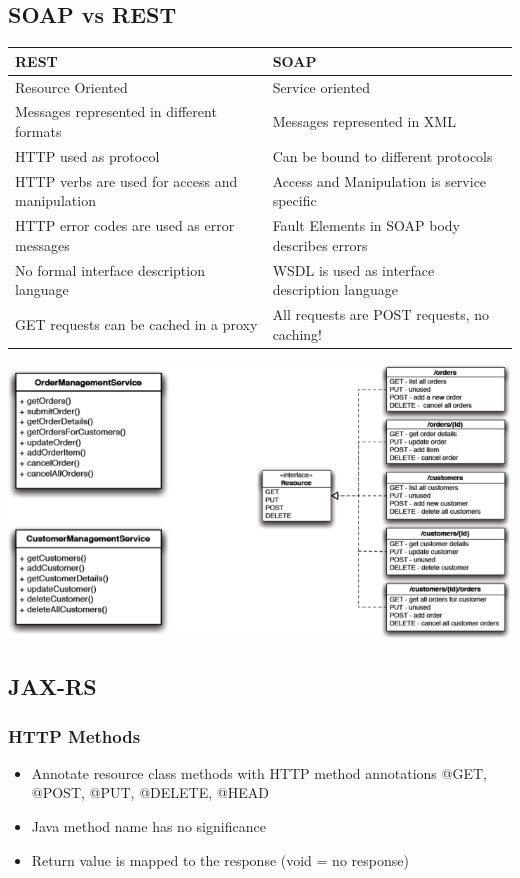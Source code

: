 \documentclass[10pt]{article}
\begin{document}
\subsection{SOAP vs REST}
\begin{tabular}{l | l}
	\textbf{REST} & \textbf{SOAP} \\
	\hline
	Resource Oriented & Service oriented \\
	Messages represented in different formats & Messages represented in XML \\
	HTTP used as protocol & Can be bound to different protocols \\
	HTTP verbs are used for access and manipulation & Access and Manipulation is service specific \\
	HTTP error codes are used as error messages & Fault Elements in SOAP body describes errors \\
	No formal interface description language & WSDL is used as interface description language \\
	GET requests can be cached in a proxy & All requests are POST requests, no caching!
\end{tabular}
\begin{center}
	\includegraphics[scale=0.5]{soap-rest.png}
\end{center}

\subsection{JAX-RS}
\subsubsection{HTTP Methods}
\begin{itemize}
	\item Annotate resource class methods with HTTP method annotations @GET, @POST, @PUT, @DELETE, @HEAD
	\item Java method name has no significance
	\item Return value is mapped to the response (void = no response)
\end{itemize}
\end{document}
